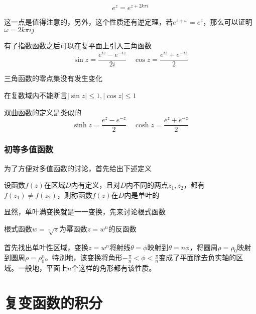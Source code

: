 \documentclass{ctexart}
\begin{document}
\begin{proposition}
    \begin{equation*}
        e^z = e^{z + 2k\pi i}
    \end{equation*}
\end{proposition}
这一点是值得注意的，另外，这个性质还有逆定理，若$e^{z + \omega} = e^z$，那么可以证明$\omega = 2k\pi ij$

有了指数函数之后可以在复平面上引入三角函数
\begin{equation*}
    \sin z = \frac{e^{iz} - e^{-iz}}{2i} \quad \cos z = \frac{e^{iz} + e^{-iz}}{2}
\end{equation*}

\begin{proposition}
    三角函数的零点集没有发生变化
\end{proposition}
\begin{proposition}
    在复数域内不能断言$|\sin z| \leq 1, |\cos z| \leq 1$
\end{proposition}

双曲函数的定义是类似的
\begin{equation*}
    \sinh z = \frac{e^z -  e^{-z}}{2} \quad \cosh z = \frac{e^z + e^{-z}}{2}
\end{equation*}

\subsubsection{初等多值函数}

为了方便对多值函数的讨论，首先给出下述定义
\begin{definition}
    设函数$f(z)$在区域$D$内有定义，且对$D$内不同的两点$z_1,z_2$，都有$f(z_1) \neq f(z_2)$，则称函数$f(z)$在$D$内是单叶的
\end{definition}

显然，单叶满变换就是一一变换，先来讨论根式函数

\begin{definition}
    根式函数$w = \sqrt[n]{z}$为幂函数$z = w^n$的反函数
\end{definition}
首先找出单叶性区域，变换$z = w^n$将射线$\theta = \phi$映射到$\theta = n\phi$，将圆周$\rho = \rho_0$映射到圆周$\rho = \rho_0^n$。特别地，该变换将角形$-\frac{\pi}{n} < \phi < \frac{\pi}{n}$变成了平面除去负实轴的区域。一般地，平面上$n$个这样的角形都有该性质。



\section{复变函数的积分}
\end{document}
